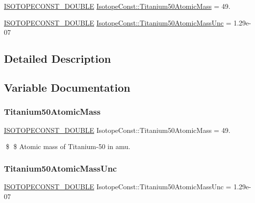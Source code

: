\begin{DoxyCompactItemize}
\item 
\mbox{\hyperlink{group___isotope_const-_macros_ga8f45a7272ce02c0b4c65c44636ed719a}{I\+S\+O\+T\+O\+P\+E\+C\+O\+N\+S\+T\+\_\+\+D\+O\+U\+B\+LE}} \mbox{\hyperlink{group___isotope_const-_titanium-_ti50_ga02678952fd01ad813c2e65eb05f12ff0}{Isotope\+Const\+::\+Titanium50\+Atomic\+Mass}} = 49.
\item 
\mbox{\hyperlink{group___isotope_const-_macros_ga8f45a7272ce02c0b4c65c44636ed719a}{I\+S\+O\+T\+O\+P\+E\+C\+O\+N\+S\+T\+\_\+\+D\+O\+U\+B\+LE}} \mbox{\hyperlink{group___isotope_const-_titanium-_ti50_ga552090f72ca00e99ffb3fd7bf6a7e3b9}{Isotope\+Const\+::\+Titanium50\+Atomic\+Mass\+Unc}} = 1.\+29e-\/07
\end{DoxyCompactItemize}


\subsection{Detailed Description}


\subsection{Variable Documentation}
\mbox{\label{group___isotope_const-_titanium-_ti50_ga02678952fd01ad813c2e65eb05f12ff0}} 
\subsubsection{\texorpdfstring{Titanium50\+Atomic\+Mass}{Titanium50AtomicMass}}
{\footnotesize\ttfamily \mbox{\hyperlink{group___isotope_const-_macros_ga8f45a7272ce02c0b4c65c44636ed719a}{I\+S\+O\+T\+O\+P\+E\+C\+O\+N\+S\+T\+\_\+\+D\+O\+U\+B\+LE}} Isotope\+Const\+::\+Titanium50\+Atomic\+Mass = 49.}

\$ \$ Atomic mass of Titanium-\/50 in amu. \mbox{\label{group___isotope_const-_titanium-_ti50_ga552090f72ca00e99ffb3fd7bf6a7e3b9}} 
\subsubsection{\texorpdfstring{Titanium50\+Atomic\+Mass\+Unc}{Titanium50AtomicMassUnc}}
{\footnotesize\ttfamily \mbox{\hyperlink{group___isotope_const-_macros_ga8f45a7272ce02c0b4c65c44636ed719a}{I\+S\+O\+T\+O\+P\+E\+C\+O\+N\+S\+T\+\_\+\+D\+O\+U\+B\+LE}} Isotope\+Const\+::\+Titanium50\+Atomic\+Mass\+Unc = 1.\+29e-\/07}

